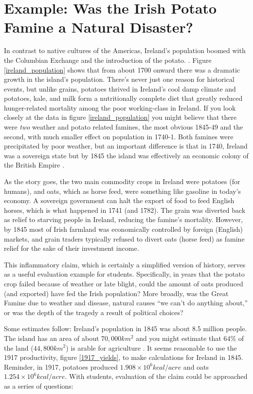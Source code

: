 \documentclass[12pt]{iopart}
\begin{document}
\clearpage


\section{Example: Was the Irish Potato Famine a Natural Disaster?}
In contrast to native cultures of the Americas, Ireland's population boomed with the Columbian Exchange and the introduction of the potato. \cite{potato,little_ice_age}.  Figure \ref{ireland_population} shows that from about 1700 onward there was a dramatic growth in the island's population.  There's never just one reason for historical events, but unlike grains, potatoes thrived in Ireland's cool damp climate and potatoes, kale, and milk form a nutritionally complete diet that greatly reduced hunger-related mortality among the poor working-class in Ireland.  If you look closely at the data in figure \ref{ireland_population} you might believe that there were \textit{two} weather and potato related famines, the most obvious 1845-49 and the second, with much smaller effect on population in 1740-1.  Both famines were precipitated by poor weather, but an important difference is that in 1740, Ireland was a sovereign state but by 1845 the island was effectively an economic colony of the British Empire \cite{little_ice_age}.  

As the story goes, the two main commodity crops in Ireland were potatoes (for humans), and oats, which as horse feed, were something like gasoline in today's economy.  A sovereign government can halt the export of food to feed English horses, which is what happened in 1741 (and 1782). The grain was diverted back as relief to starving people in Ireland, reducing the famine's mortality. However, by 1845 most of Irish farmland was economically controlled by foreign (English) markets, and grain traders typically refused to divert oats (horse feed) as famine relief for the sake of their investment income.

This inflammatory claim, which is certainly a simplified version of history, serves as a useful evaluation example for students. Specifically, in years that the potato crop failed because of weather or late blight, could the amount of oats produced (and exported) have fed the Irish population?  More broadly, was the Great Famine due to weather and disease, natural causes ``we can't do anything about,''  or was the depth of the tragedy a result of political choices?

Some estimates follow:  Ireland's population in 1845 was about 8.5 million people.  The island has an area of about $70,000km^2$ and you might estimate that $64\%$ of the land ($44,800km^2$) is arable for agriculture \cite{arable_percentage}.  
It seems reasonable to use the 1917 productivity,  figure \ref{1917_yields},  to make calculations for Ireland in 1845.  Reminder, in 1917, potatoes produced $1.908\times10^6 kcal/acre$ and oats $1.254\times10^6kcal/acre$.
With students, evaluation of the claim could be approached as a series of questions:
\end{document}

